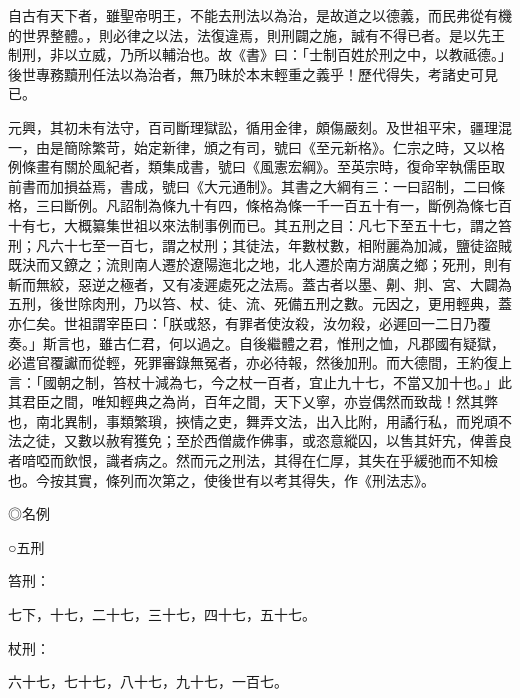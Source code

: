 
\begin{pinyinscope}

 自古有天下者，雖聖帝明王，不能去刑法以為治，是故道之以德義，而民弗從有機的世界整體。，則必律之以法，法復違焉，則刑闢之施，誠有不得已者。是以先王制刑，非以立威，乃所以輔治也。故《書》曰：「士制百姓於刑之中，以教祗德。」後世專務黷刑任法以為治者，無乃昧於本末輕重之義乎！歷代得失，考諸史可見已。



 元興，其初未有法守，百司斷理獄訟，循用金律，頗傷嚴刻。及世祖平宋，疆理混一，由是簡除繁苛，始定新律，頒之有司，號曰《至元新格》。仁宗之時，又以格例條畫有關於風紀者，類集成書，號曰《風憲宏綱》。至英宗時，復命宰執儒臣取前書而加損益焉，書成，號曰《大元通制》。其書之大綱有三：一曰詔制，二曰條格，三曰斷例。凡詔制為條九十有四，條格為條一千一百五十有一，斷例為條七百十有七，大概纂集世祖以來法制事例而已。其五刑之目：凡七下至五十七，謂之笞刑；凡六十七至一百七，謂之杖刑；其徒法，年數杖數，相附麗為加減，鹽徒盜賊既決而又鐐之；流則南人遷於遼陽迤北之地，北人遷於南方湖廣之鄉；死刑，則有斬而無絞，惡逆之極者，又有凌遲處死之法焉。蓋古者以墨、劓、剕、宮、大闢為五刑，後世除肉刑，乃以笞、杖、徒、流、死備五刑之數。元因之，更用輕典，蓋亦仁矣。世祖謂宰臣曰：「朕或怒，有罪者使汝殺，汝勿殺，必遲回一二日乃覆奏。」斯言也，雖古仁君，何以過之。自後繼體之君，惟刑之恤，凡郡國有疑獄，必遣官覆讞而從輕，死罪審錄無冤者，亦必待報，然後加刑。而大德間，王約復上言：「國朝之制，笞杖十減為七，今之杖一百者，宜止九十七，不當又加十也。」此其君臣之間，唯知輕典之為尚，百年之間，天下乂寧，亦豈偶然而致哉！然其弊也，南北異制，事類繁瑣，挾情之吏，舞弄文法，出入比附，用譎行私，而兇頑不法之徒，又數以赦宥獲免；至於西僧歲作佛事，或恣意縱囚，以售其奸宄，俾善良者喑啞而飲恨，識者病之。然而元之刑法，其得在仁厚，其失在乎緩弛而不知檢也。今按其實，條列而次第之，使後世有以考其得失，作《刑法志》。



 ◎名例



 ○五刑



 笞刑：



 七下，十七，二十七，三十七，四十七，五十七。



 杖刑：



 六十七，七十七，八十七，九十七，一百七。




\end{pinyinscope}
